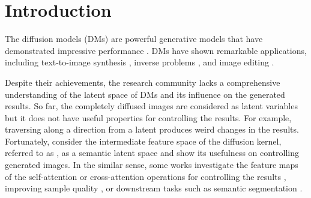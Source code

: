 \section{Introduction}
The diffusion models (DMs) are powerful generative models that have demonstrated impressive performance \cite{ho2020denoising, song2020denoising, song2020score, dhariwal2021diffusion, nichol2021improved}. 
DMs have shown remarkable applications, including text-to-image synthesis \cite{ramesh2022hierarchical, rombach2022high, balaji2022ediffi, nichol2021glide}, inverse problems \cite{chung2022improving, lugmayr2022repaint}, and image editing \cite{hertz2022prompt, tumanyan2022plug, parmar2023zero, mokady2022null}.


Despite their achievements, the research community lacks a comprehensive understanding of the latent space of DMs and its influence on the generated results. So far, the completely diffused images are considered as latent variables but it does not have useful properties for controlling the results. For example, traversing along a direction from a latent produces weird changes in the results.
Fortunately, \citet{kwon2022diffusion} consider the intermediate feature space of the diffusion kernel, referred to as \ehspace{}, as a semantic latent space and show its usefulness on controlling generated images. In the similar sense, some works investigate the feature maps of the self-attention or cross-attention operations for controlling the results \cite{hertz2022prompt, tumanyan2022plug, parmar2023zero}, improving sample quality \cite{chefer2023attend}, or downstream tasks such as semantic segmentation \cite{ma2023diffusionseg, xu2023open}.

